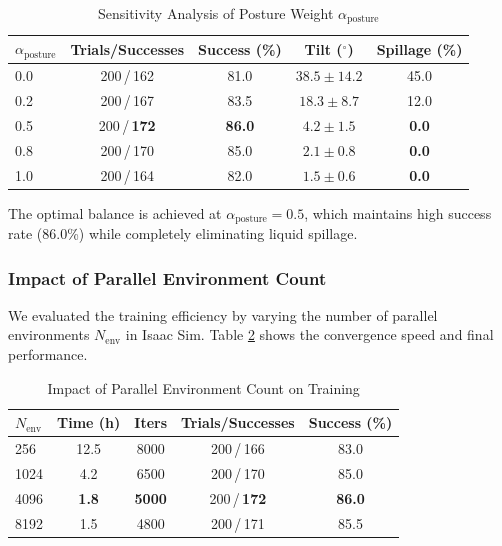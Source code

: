 \begin{table}[!t]
\renewcommand{\arraystretch}{1.3}
\caption{Sensitivity Analysis of Posture Weight $\alpha_{\text{posture}}$}
\label{tab:sensitivity}
\centering
\begin{tabular}{lcccc}
\hline\hline
\textbf{$\alpha_{\text{posture}}$} & \textbf{Trials/Successes} & \textbf{Success (\%)} & \textbf{Tilt ($^\circ$)} & \textbf{Spillage (\%)} \\ \hline
0.0 & 200\,/\,162 & 81.0 & $38.5 \pm 14.2$ & 45.0 \\
0.2 & 200\,/\,167 & 83.5 & $18.3 \pm 8.7$ & 12.0 \\
0.5 & 200\,/\,\textbf{172} & \textbf{86.0} & $4.2 \pm 1.5$ & \textbf{0.0} \\
0.8 & 200\,/\,170 & 85.0 & $2.1 \pm 0.8$ & \textbf{0.0} \\
1.0 & 200\,/\,164 & 82.0 & $1.5 \pm 0.6$ & \textbf{0.0} \\ \hline\hline
\end{tabular}
\end{table}

The optimal balance is achieved at $\alpha_{\text{posture}} = 0.5$, which maintains high success rate (86.0\%) while completely eliminating liquid spillage.

\subsubsection{Impact of Parallel Environment Count}
\label{subsec:parallel_envs}

We evaluated the training efficiency by varying the number of parallel environments $N_{\text{env}}$ in Isaac Sim. Table \ref{tab:parallel_envs} shows the convergence speed and final performance.

\begin{table}[!t]
\renewcommand{\arraystretch}{1.3}
\caption{Impact of Parallel Environment Count on Training}
\label{tab:parallel_envs}
\centering
\begin{tabular}{lcccc}
\hline\hline
\textbf{$N_{\text{env}}$} & \textbf{Time (h)} & \textbf{Iters} & \textbf{Trials/Successes} & \textbf{Success (\%)} \\ \hline
256 & 12.5 & 8000 & 200\,/\,166 & 83.0 \\
1024 & 4.2 & 6500 & 200\,/\,170 & 85.0 \\
4096 & \textbf{1.8} & \textbf{5000} & 200\,/\,\textbf{172} & \textbf{86.0} \\
8192 & 1.5 & 4800 & 200\,/\,171 & 85.5 \\ \hline\hline
\end{tabular}
\end{table}

